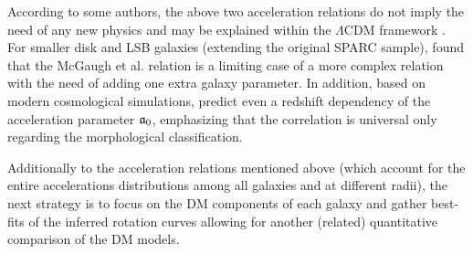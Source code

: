 According to some authors, the above two acceleration relations do not imply the need of any new physics and may be explained within the $\Lambda$CDM framework \citep{2016MNRAS.456L.127D,2017MNRAS.466.1648K,2016arXiv161208857S,2018FoPh...48.1517S}. For smaller disk and LSB galaxies (extending the original SPARC sample), \citet{2019ApJ...873..106D} found that the McGaugh et al. relation is a limiting case of a more complex relation with the need of adding one extra galaxy parameter. In addition, based on modern cosmological simulations, \citet{2017ApJ...835L..17K} predict even a redshift dependency of the acceleration parameter $\mathfrak{a}_0$, emphasizing that the correlation is universal only regarding the morphological classification.


Additionally to the acceleration relations mentioned above (which account for the entire accelerations distributions among all galaxies and at different radii), the next strategy is to focus on the DM components of each galaxy and gather best-fits of the inferred rotation curves allowing for another (related) quantitative comparison of the DM models.